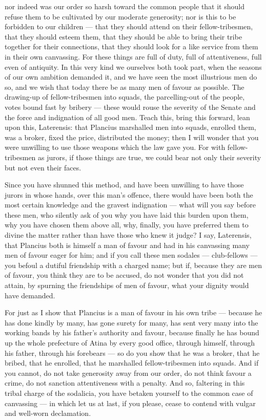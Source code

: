  nor indeed was our order so harsh toward the common people that it should refuse them to be cultivated by our moderate generosity; nor is this to be forbidden to our children --- that they should attend on their fellow-tribesmen, that they should esteem them, that they should be able to bring their tribe together for their connections, that they should look for a like service from them in their own canvassing. For these things are full of duty, full of attentiveness, full even of antiquity. In this very kind we ourselves both took part, when the seasons of our own ambition demanded it, and we have seen the most illustrious men do so, and we wish that today there be as many men of favour as possible. The drawing-up of fellow-tribesmen into squads, the parcelling-out of the people, votes bound fast by bribery --- these would rouse the severity of the Senate and the force and indignation of all good men. Teach this, bring this forward, lean upon this, Laterensis: that Plancius marshalled men into squads, enrolled them, was a broker, fixed the price, distributed the money; then I will wonder that you were unwilling to use those weapons which the law gave you. For with fellow-tribesmen as jurors, if those things are true, we could bear not only their severity but not even their faces.

 Since you have shunned this method, and have been unwilling to have those jurors in whose hands, over this man's offence, there would have been both the most certain knowledge and the gravest indignation --- what will you say before these men, who silently ask of you why you have laid this burden upon them, why you have chosen them above all, why, finally, you have preferred them to divine the matter rather than have those who knew it judge? I say, Laterensis, that Plancius both is himself a man of favour and had in his canvassing many men of favour eager for him; and if you call these men sodales --- club-fellows --- you befoul a dutiful friendship with a charged name; but if, because they are men of favour, you think they are to be accused, do not wonder that you did not attain, by spurning the friendships of men of favour, what your dignity would have demanded.

 For just as I show that Plancius is a man of favour in his own tribe --- because he has done kindly by many, has gone surety for many, has sent very many into the working bands by his father's authority and favour, because finally he has bound up the whole prefecture of Atina by every good office, through himself, through his father, through his forebears --- so do you show that he was a broker, that he bribed, that he enrolled, that he marshalled fellow-tribesmen into squads. And if you cannot, do not take generosity away from our order, do not think favour a crime, do not sanction attentiveness with a penalty. And so, faltering in this tribal charge of the sodalicia, you have betaken yourself to the common case of canvassing --- in which let us at last, if you please, cease to contend with vulgar and well-worn declamation.

